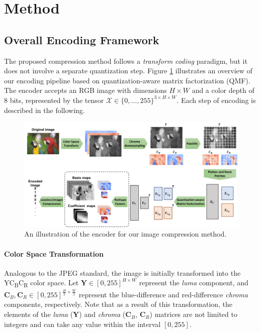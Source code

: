 \section{Method} \label{sec:method}


\subsection{Overall Encoding Framework} \label{sec:overall_framework}

The proposed compression method follows a \emph{transform coding} paradigm, but it does not involve a separate quantization step. Figure \ref{fig:qmf_encoder} illustrates an overview of our encoding pipeline based on quantization-aware matrix factorization (QMF). The encoder accepts an RGB image with dimensions $H \times W$ and a color depth of 8 bits, represented by the tensor $\bm{\mathcal{X}} \in \{0, \ldots, 255\}^{3 \times H \times W}$. Each step of encoding is described in the following.

\begin{figure}[!t]
    \centering
    \includegraphics[width=\textwidth]{figures/qmf_encoder.pdf}
    \caption{An illustration of the encoder for our image compression method.}
    \label{fig:qmf_encoder}
\end{figure}

\paragraph{Color Space Transformation}
Analogous to the JPEG standard, the image is initially transformed into the YC\textsubscript{B}C\textsubscript{R} color space. Let $\bm{Y} \in [0, 255]^{H \times W}$ represent the \emph{luma} component, and $\bm{C}_B, \bm{C}_R \in [0, 255]^{\frac{H}{2} \times \frac{W}{2}}$ represent the blue-difference and red-difference \emph{chroma} components, respectively. Note that as a result of this transformation, the elements of the \emph{luma} ($\bm{Y}$) and \emph{chroma} ($\bm{C}_B$, $\bm{C}_R$) matrices are not limited to integers and can take any value within the interval $[0, 255]$.

